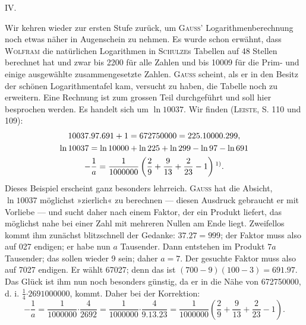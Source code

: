 \clearpage\begingroup
{}
\renewcommand{\thefootnote}{\arabic{footnote})}\setcounter{footnote}{0}
\begin{center}IV.\\[3pt]{\large{}}\end{center}
\noindent\hspace*{\parindent}Wir kehren wieder zur ersten Stufe zurück, um \textsc{Gauss}’ Logarithmenberechnung noch etwas näher in Augenschein zu nehmen. Es wurde schon
erwähnt, dass \textsc{Wolfram} die natürlichen Logarithmen in \textsc{Schulze}s Tabellen
auf 48 Stellen berechnet hat und zwar bis 2200 für alle Zahlen und bis 10009
für die Prim- und einige ausgewählte zusammengesetzte Zahlen. \textsc{Gauss} scheint,
als er in den Besitz der schönen Logarithmentafel kam, versucht zu haben,
die Tabelle noch zu erweitern. Eine Rechnung ist zum grossen Teil durchgeführt und soll hier besprochen werden. Es handelt sich um $\ln10037$. Wir
finden (\textsc{Leiste}, S. 110 und 109):
\[
\begin{gathered}
10037\mathord{.}97\mathord{.}691+1=672750000=225\mathord{.}10000\mathord{.}299,\\
\ln10037=\ln10000+\ln225+\ln299-\ln97-\ln691\\
-\frac{1}{a}=\frac{1}{1000000}\left(\frac{2}{9}+\frac{9}{13}+\frac{2}{23}-1\right)\text{\textsuperscript{1)}}.
\end{gathered}
\]
\setcounter{footnote}{1}
\noindent Dieses Beispiel erscheint ganz besonders lehrreich. \textsc{Gauss} hat die Absicht,
$\ln10037$ möglichst »zierlich« zu berechnen — diesen Ausdruck gebraucht er
mit Vorliebe — und sucht daher nach einem Faktor, der ein Produkt liefert,
das möglichst nahe bei einer Zahl mit mehreren Nullen am Ende liegt.
Zweifellos kommt ihm zunächst blitzschnell der Gedanke: $37\mathord{.}27=999$; der
Faktor muss also auf 027 endigen; er habe nun $a$ Tausender. Dann entstehen im Produkt $7a$ Tausender; das sollen wieder 9 sein; daher $a=7$.
Der gesuchte Faktor muss also auf 7027 endigen. Er wählt 67027; denn
das ist $(700-9)(100-3)=691\mathord{.}97$. Das Glück ist ihm nun noch besonders
günstig, da er in die Nähe von 672750000, d. i. $\frac14\mathord{\cdot}2691000000$, kommt.
Daher bei der Korrektion:
\[
-\frac{1}{a}=\frac{1}{1000000}\mathord{\cdot}\frac{4}{2692}=\frac{1}{1000000}\mathord{\cdot}\frac{4}{9\mathord{.}13\mathord{.}23}=\frac{1}{1000000}\left(\frac{2}{9}+\frac{9}{13}+\frac{2}{23}-1\right).
\]
